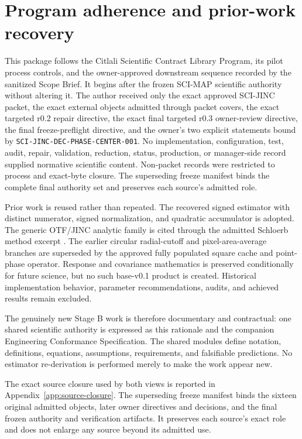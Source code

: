 \documentclass[11pt]{article}
\begin{document}
\tableofcontents
\clearpage

\section{Program adherence and prior-work recovery}
\label{sec:program-adherence}

This package follows the Citlali Scientific Contract Library Program, its
pilot process controls, and the owner-approved downstream sequence recorded by
the sanitized Scope Brief.  It begins after the frozen SCI-MAP scientific
authority without altering it.  The author received only the exact approved
SCI-JINC packet, the exact external objects admitted through packet covers,
the exact targeted r0.2 repair directive, the exact final targeted r0.3
owner-review directive, the final freeze-preflight directive, and the owner's
two explicit statements bound by
\texttt{SCI-JINC-DEC-PHASE-CENTER-001}.
No implementation, configuration, test, audit, repair, validation, reduction,
status, production, or manager-side record supplied normative scientific
content.  Non-packet records were restricted to process and exact-byte
closure.  The superseding freeze manifest binds the complete final authority
set and preserves each source's admitted role.

Prior work is reused rather than repeated.  The recovered signed estimator
with distinct numerator, signed normalization, and quadratic accumulator is
adopted.  The generic OTF/JINC analytic family is cited through the admitted
Schloerb method excerpt \cite{schloerb2019}.  The earlier circular radial-cutoff
and pixel-area-average branches are superseded by the approved fully populated
square cache and point-phase operator.  Response and covariance mathematics is
preserved conditionally for future science, but no such base-v0.1 product is
created.  Historical implementation behavior, parameter recommendations,
audits, and achieved results remain excluded.

The genuinely new Stage B work is therefore documentary and contractual: one
shared scientific authority is expressed as this rationale and the companion
Engineering Conformance Specification.  The shared modules define notation,
definitions, equations, assumptions, requirements, and falsifiable
predictions.  No estimator re-derivation is performed merely to make the work
appear new.

The exact source closure used by both views is reported in
Appendix~\ref{app:source-closure}.  The superseding freeze manifest binds the
sixteen original admitted objects, later owner directives and decisions, and
the final frozen authority and verification artifacts.  It preserves each
source's exact role and does not enlarge any source beyond its admitted use.
\end{document}
